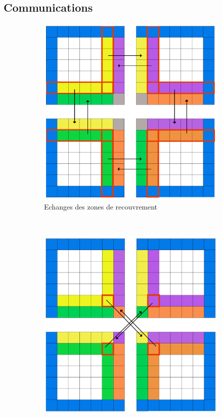 \documentclass{beamer}
\begin{document}
\subsection{Communications}
\begin{frame}
  \begin{figure}[!ht]
  \centering
  \begin{subfigure}[b]{0.5\textwidth}
    \centering
    \includegraphics[scale=0.12]{figures/neigh1.png}
    \caption{\label{fig:comm_neigh}Echanges des zones de recouvrement}
  \end{subfigure}%
  ~
  \begin{subfigure}[b]{0.5\textwidth}
    \centering
    \includegraphics[scale=0.12]{figures/comm3.png}

\end{subfigure}
\end{figure}
\end{frame}
\end{document}
